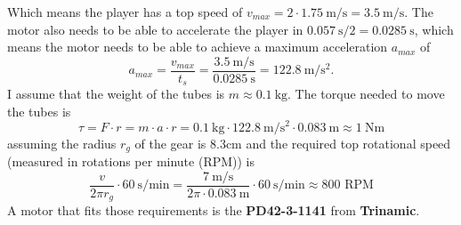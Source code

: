 \noindent Which means the player has a top speed of $v_{max}=2\cdot \qty[per-mode=symbol]{1.75}{\m\per\s}=\qty[per-mode=symbol]{3.5}{\m\per\s}$.
The motor also needs to be able to accelerate the player in $\qty[per-mode=symbol]{0.057}{\s}/2=\qty[per-mode=symbol]{0.0285}{\s}$, which means the motor needs to be able to achieve a maximum acceleration $a_{max}$ of
\begin{equation}
    \label{eq:acceleration}
    a_{max} = \frac{v_{max}}{t_s} = \frac{\qty[per-mode=symbol]{3.5}{\m\per\s}}{\qty[per-mode=symbol]{0.0285}{\s}} = \qty[per-mode=symbol]{122.8}{\m\per\s\squared}.
\end{equation}
I assume that the weight of the tubes is $m \approx \qty[per-mode=symbol]{0.1}{\kg}$.
The torque needed to move the tubes is
\begin{equation}
    \label{eq:torque}
    \tau = F \cdot r = m \cdot a \cdot r = \qty[per-mode=symbol]{0.1}{\kg} \cdot \qty[per-mode=symbol]{122.8}{\m\per\s\squared} \cdot \qty[per-mode=symbol]{0.083}{\m} \approx \qty[per-mode=symbol]{1}{\N\m}
\end{equation}
assuming the radius $r_g$ of the gear is 8.3cm and the required top rotational speed (measured in rotations per minute (RPM)) is
\begin{equation}
    \label{eq:top_rpm}
    \frac{v}{2\pi r_g} \cdot \qty[per-mode=symbol]{60}{\s\per\minute} = \frac{\qty[per-mode=symbol]{7}{\m\per\s}}{2\pi \cdot \qty[per-mode=symbol]{0.083}{\m}} \cdot \qty[per-mode=symbol]{60}{\s\per\minute} \approx 800\text{ RPM}
\end{equation}
A motor that fits those requirements is the \textbf{PD42-3-1141\autocite{PD42-3-1141}} from \textbf{Trinamic}.


